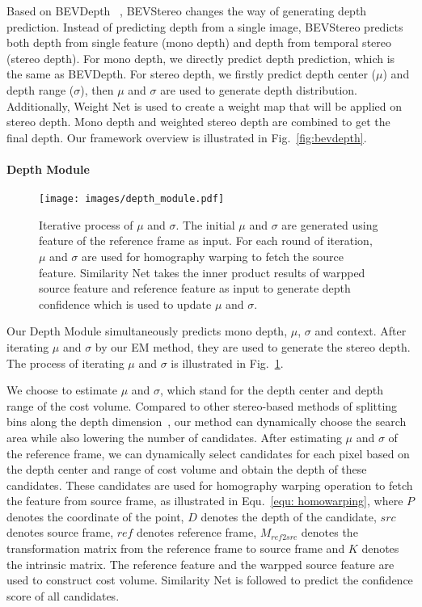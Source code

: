 \documentclass[letterpaper]{article} \usepackage[]{aaai23}  \usepackage{times}  \usepackage{helvet}  \usepackage{courier}  \usepackage[hyphens]{url}  \usepackage{graphicx} \urlstyle{rm} \def\UrlFont{\rm}  \usepackage{natbib}  \usepackage{caption} \frenchspacing  \setlength{\pdfpagewidth}{8.5in} \setlength{\pdfpageheight}{11in} \usepackage{algorithm}
\begin{document}
Based on BEVDepth ~\cite{li2022bevdepth}, BEVStereo changes the way of generating depth prediction. Instead of predicting depth from a single image, BEVStereo predicts both depth from single feature (mono depth) and depth from temporal stereo (stereo depth). For mono depth, we directly predict depth prediction, which is the same as BEVDepth. For stereo depth, we firstly predict depth center ($\mu$) and depth range ($\sigma$), then $\mu$ and $\sigma$ are used to generate depth distribution. Additionally, Weight Net is used to create a weight map that will be applied on stereo depth. Mono depth and weighted stereo depth are combined to get the final depth. Our framework overview is illustrated in Fig.~\ref{fig:bevdepth}. 

\paragraph{Depth Module}
\begin{figure}[t]
\texttt{[image: images/depth\_module.pdf]}
\centering
\caption{Iterative process of $\mu$ and $\sigma$. The initial $\mu$ and $\sigma$ are generated using feature of the reference frame as input. For each round of iteration, $\mu$ and $\sigma$ are used for homography warping to fetch the source feature. Similarity Net takes the inner product results of warpped source feature and reference feature as input to generate depth confidence which is used to update $\mu$ and $\sigma$.}
\label{fig:depth_module}
\end{figure}
Our Depth Module simultaneously predicts  mono depth, $\mu$, $\sigma$ and context. After iterating $\mu$ and $\sigma$ by our EM method, they are used to generate the stereo depth. The process of iterating $\mu$ and $\sigma$ is illustrated in Fig.~\ref{fig:depth_module}.

We choose to estimate $\mu$ and $\sigma$, which stand for the depth center and depth range of the cost volume.
Compared to other stereo-based methods of splitting bins along the depth dimension~\cite{yao2018mvsnet, wang2022mv}, our method can dynamically choose the search area while also lowering the number of candidates. After estimating $\mu$ and $\sigma$ of the reference frame, we can dynamically select candidates for each pixel based on the depth center and range of cost volume and obtain the depth of these candidates. These candidates are used for homography warping operation to fetch the feature from source frame, as illustrated in Equ.~\ref{equ: homowarping}, where $P$ denotes the coordinate of the point, $D$ denotes the depth of the candidate, $src$ denotes source frame, $ref$ denotes reference frame, $M_{ref2src}$ denotes the transformation matrix from the reference frame to source frame and $K$ denotes the intrinsic matrix. The reference feature and the warpped source feature are used to construct cost volume. Similarity Net is followed to predict the confidence score of all candidates.
\end{document}
